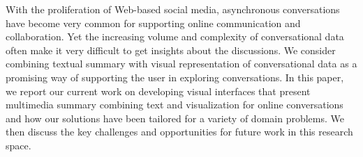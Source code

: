 With the proliferation of Web-based social media, asynchronous conversations have become very common for supporting online communication and collaboration. Yet the increasing volume and complexity of conversational data often make it very difficult to get insights about the discussions. We consider combining textual summary with visual representation of conversational data as a promising way of supporting the user in exploring conversations. In this paper, we report our current work on developing visual interfaces that present multimedia summary combining text and visualization for online conversations and how our solutions have been tailored for a variety of domain problems. We then discuss the key challenges and opportunities for future work in this research space.
